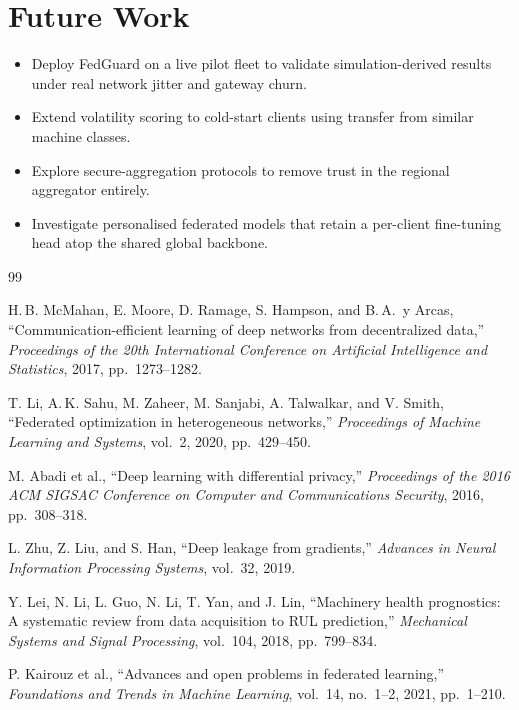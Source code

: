 \section{Future Work}
\begin{itemize}[leftmargin=1.4em]
  \item Deploy FedGuard on a live pilot fleet to validate simulation-derived results
        under real network jitter and gateway churn.
  \item Extend volatility scoring to cold-start clients using transfer from similar
        machine classes.
  \item Explore secure-aggregation protocols to remove trust in the regional
        aggregator entirely.
  \item Investigate personalised federated models that retain a per-client fine-tuning
        head atop the shared global backbone.
\end{itemize}

\begin{thebibliography}{99}

H.\,B. McMahan, E. Moore, D. Ramage, S. Hampson, and B.\,A.\ y Arcas,
``Communication-efficient learning of deep networks from decentralized data,''
\textit{Proceedings of the 20th International Conference on Artificial Intelligence and
Statistics}, 2017, pp.\ 1273--1282.

T. Li, A.\,K. Sahu, M. Zaheer, M. Sanjabi, A. Talwalkar, and V. Smith,
``Federated optimization in heterogeneous networks,''
\textit{Proceedings of Machine Learning and Systems}, vol.\ 2, 2020, pp.\ 429--450.

M. Abadi et al., ``Deep learning with differential privacy,''
\textit{Proceedings of the 2016 ACM SIGSAC Conference on Computer and Communications
Security}, 2016, pp.\ 308--318.

L. Zhu, Z. Liu, and S. Han, ``Deep leakage from gradients,''
\textit{Advances in Neural Information Processing Systems}, vol.\ 32, 2019.

Y. Lei, N. Li, L. Guo, N. Li, T. Yan, and J. Lin,
``Machinery health prognostics: A systematic review from data acquisition to RUL
prediction,'' \textit{Mechanical Systems and Signal Processing}, vol.\ 104, 2018,
pp.\ 799--834.

P. Kairouz et al., ``Advances and open problems in federated learning,''
\textit{Foundations and Trends in Machine Learning}, vol.\ 14, no.\ 1--2, 2021,
pp.\ 1--210.

\end{thebibliography}

\appendix
